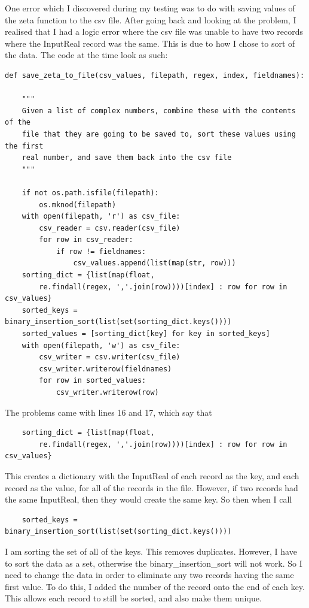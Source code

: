 \documentclass{article}
\begin{document}
\clearpage

One error which I discovered during my testing was to do with saving values of the zeta function to the csv file. After going back and looking at the problem, I realised that I had a logic error where the csv file was unable to have two records where the InputReal record was the same. This is due to how I chose to sort of the data. The code at the time look as such:

\begin{lstlisting}
def save_zeta_to_file(csv_values, filepath, regex, index, fieldnames):

    """
    Given a list of complex numbers, combine these with the contents of the
    file that they are going to be saved to, sort these values using the first
    real number, and save them back into the csv file
    """

    if not os.path.isfile(filepath):
        os.mknod(filepath)
    with open(filepath, 'r') as csv_file:
        csv_reader = csv.reader(csv_file)
        for row in csv_reader:
            if row != fieldnames:
                csv_values.append(list(map(str, row)))
    sorting_dict = {list(map(float,
        re.findall(regex, ','.join(row))))[index] : row for row in csv_values}
    sorted_keys = binary_insertion_sort(list(set(sorting_dict.keys())))
    sorted_values = [sorting_dict[key] for key in sorted_keys]
    with open(filepath, 'w') as csv_file:
        csv_writer = csv.writer(csv_file)
        csv_writer.writerow(fieldnames)
        for row in sorted_values:
            csv_writer.writerow(row)
\end{lstlisting}

The problems came with lines 16 and 17, which say that

\begin{lstlisting}
    sorting_dict = {list(map(float,
        re.findall(regex, ','.join(row))))[index] : row for row in csv_values}
\end{lstlisting}

This creates a dictionary with the InputReal of each record as the key, and each record as the value, for all of the records in the file. However, if two records had the same InputReal, then they would create the same key. So then when I call

\begin{lstlisting}
    sorted_keys = binary_insertion_sort(list(set(sorting_dict.keys())))
\end{lstlisting}

I am sorting the set of all of the keys. This removes duplicates. However, I have to sort the data as a set, otherwise the binary\_insertion\_sort will not work. So I need to change the data in order to eliminate any two records having the same first value. To do this, I added the number of the record onto the end of each key. This allows each record to still be sorted, and also make them unique.
\end{document}
